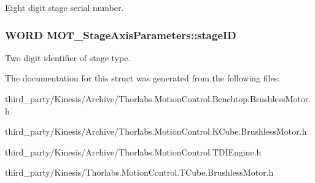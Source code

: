 Eight digit stage serial number. 

\subsubsection[{\texorpdfstring{stage\+ID}{stageID}}]{\setlength{\rightskip}{0pt plus 5cm}W\+O\+RD M\+O\+T\+\_\+\+Stage\+Axis\+Parameters\+::stage\+ID}\hypertarget{struct_m_o_t___stage_axis_parameters_a3fdc6e312480f6188136aadbe440f934}{}\label{struct_m_o_t___stage_axis_parameters_a3fdc6e312480f6188136aadbe440f934}


Two digit identifier of stage type. 



The documentation for this struct was generated from the following files\+:\begin{DoxyCompactItemize}
\item 
third\+\_\+party/\+Kinesis/\+Archive/Thorlabs.\+Motion\+Control.\+Benchtop.\+Brushless\+Motor.\+h\item 
third\+\_\+party/\+Kinesis/\+Archive/Thorlabs.\+Motion\+Control.\+K\+Cube.\+Brushless\+Motor.\+h\item 
third\+\_\+party/\+Kinesis/\+Archive/Thorlabs.\+Motion\+Control.\+T\+D\+I\+Engine.\+h\item 
third\+\_\+party/\+Kinesis/Thorlabs.\+Motion\+Control.\+T\+Cube.\+Brushless\+Motor.\+h\end{DoxyCompactItemize}
